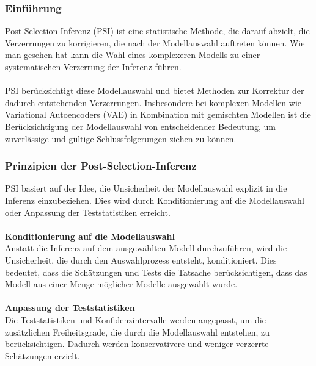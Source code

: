 \documentclass[%
thesis=student,%
coverpage=false,%
titlepage=false,%
headmarks=true, %
german,%
font=libertine, %
math=newpxtx, %
BCOR=5mm,%
coverBCOR=11mm%
]{tumbook}
\theoremstyle{break}
\begin{document}
\subsubsection{Einführung}
Post-Selection-Inferenz (PSI) ist eine statistische Methode, die darauf abzielt, die Verzerrungen zu korrigieren, die nach der Modellauswahl auftreten können. Wie man gesehen hat kann die Wahl eines komplexeren Modells zu einer systematischen Verzerrung der Inferenz führen.\\
\\
PSI berücksichtigt diese Modellauswahl und bietet Methoden zur Korrektur der dadurch entstehenden Verzerrungen. Insbesondere bei komplexen Modellen wie Variational Autoencoders (VAE) in Kombination mit gemischten Modellen ist die Berücksichtigung der Modellauswahl von entscheidender Bedeutung, um zuverlässige und gültige Schlussfolgerungen ziehen zu können.

\subsubsection{Prinzipien der Post-Selection-Inferenz}
PSI basiert auf der Idee, die Unsicherheit der Modellauswahl explizit in die Inferenz einzubeziehen. Dies wird durch Konditionierung auf die Modellauswahl oder Anpassung der Teststatistiken erreicht.\\
\\
\textbf{Konditionierung auf die Modellauswahl}\\
Anstatt die Inferenz auf dem ausgewählten Modell durchzuführen, wird die Unsicherheit, die durch den Auswahlprozess entsteht, konditioniert. Dies bedeutet, dass die Schätzungen und Tests die Tatsache berücksichtigen, dass das Modell aus einer Menge möglicher Modelle ausgewählt wurde.\\
\\
\textbf{Anpassung der Teststatistiken}\\
Die Teststatistiken und Konfidenzintervalle werden angepasst, um die zusätzlichen Freiheitsgrade, die durch die Modellauswahl entstehen, zu berücksichtigen. Dadurch werden konservativere und weniger verzerrte Schätzungen erzielt.
\end{document}
